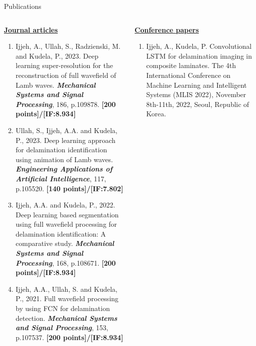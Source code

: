 \documentclass[10pt,aspectratio=169,dvipsnames]{beamer} %
\begin{document}
	\begin{frame}{Publications}
		\vspace{5pt}
		\addtolength{\leftmargini}{\labelsep}
		\begin{tiny}					
			\begin{columns}[T]
				\begin{column}[t]{0.48\textwidth}
					\underline{\textbf{Journal articles}}
					\begin{enumerate}
						\justifying
						\item Ijjeh, A., Ullah, S., Radzienski, M. and Kudela, P., 2023. Deep learning super-resolution for the reconstruction of full wavefield of Lamb waves. \textbf{\textit{Mechanical Systems and Signal Processing}}, 186, p.109878.						
						\textbf{[200 points]/[IF:8.934]}
						\item Ullah, S., Ijjeh, A.A. and Kudela, P., 2023. Deep learning approach for delamination identification using animation of Lamb waves. 						
						\textbf{\textit{Engineering Applications of Artificial Intelligence}}, 117, p.105520.		
						\textbf{[140 points]/[IF:7.802]}
						\item Ijjeh, A.A. and Kudela, P., 2022. Deep learning based segmentation using full wavefield processing for delamination identification: A comparative study. \textbf{\textit{Mechanical Systems and Signal Processing}}, 168, p.108671. \textbf{[200 points]/[IF:8.934]}
						\item Ijjeh, A.A., Ullah, S. and Kudela, P., 2021. Full wavefield processing by using FCN for delamination detection. \textbf{\textit{Mechanical Systems and Signal Processing}}, 153, p.107537.		
						\textbf{[200 points]/[IF:8.934]}	
					\end{enumerate}					
				\end{column}
				\begin{column}[t]{0.48\textwidth}
					\underline{\textbf{Conference papers}}
					\begin{enumerate}
						\justifying
						\item {Ijjeh, A.}, Kudela, P. Convolutional LSTM for delamination imaging in composite laminates. 
						The 4th International Conference on Machine Learning and Intelligent Systems (MLIS 2022), November 8th-11th, 2022, Seoul, Republic of Korea.

\end{enumerate}
\end{column}
\end{columns}
\end{tiny}
\end{frame}
\end{document}
